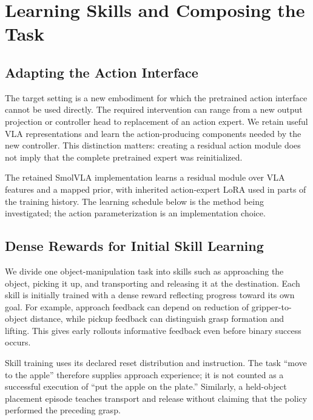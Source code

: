 \section{Learning Skills and Composing the Task}\label{sec:method}
\subsection{Adapting the Action Interface}
The target setting is a new embodiment for which the pretrained action interface cannot be used directly. The required intervention can range from a new output projection or controller head to replacement of an action expert. We retain useful VLA representations and learn the action-producing components needed by the new controller. This distinction matters: creating a residual action module does not imply that the complete pretrained expert was reinitialized.

The retained SmolVLA implementation learns a residual module over VLA features and a mapped prior, with inherited action-expert LoRA used in parts of the training history.  The learning schedule below is the method being investigated; the action parameterization is an implementation choice.

\subsection{Dense Rewards for Initial Skill Learning}
We divide one object-manipulation task into skills such as approaching the object, picking it up, and transporting and releasing it at the destination. Each skill is initially trained with a dense reward reflecting progress toward its own goal. For example, approach feedback can depend on reduction of gripper-to-object distance, while pickup feedback can distinguish grasp formation and lifting. This gives early rollouts informative feedback even before binary success occurs.

Skill training uses its declared reset distribution and instruction. The task ``move to the apple'' therefore supplies approach experience; it is not counted as a successful execution of ``put the apple on the plate.'' Similarly, a held-object placement episode teaches transport and release without claiming that the policy performed the preceding grasp. 

